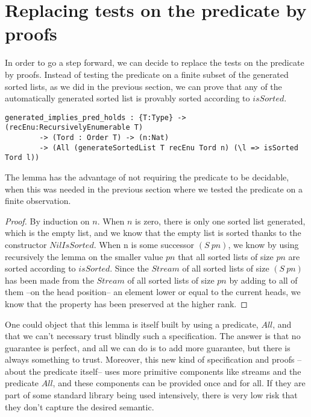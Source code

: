 \section{Replacing tests on the predicate by proofs}

\label{sect:aStepForward}

In order to go a step forward, we can decide to replace the tests on the predicate by proofs. Instead of testing the predicate on a finite subset of the generated sorted lists, as we did in the previous section, we can prove that any of the automatically generated sorted list is provably sorted according to $isSorted$.

\begin{lstlisting}
generated_implies_pred_holds : {T:Type} -> (recEnu:RecursivelyEnumerable T) 
        -> (Tord : Order T) -> (n:Nat) 
        -> (All (generateSortedList T recEnu Tord n) (\l => isSorted Tord l))
\end{lstlisting}

The lemma has the advantage of not requiring the predicate to be decidable, when this was needed in the previous section where we tested the predicate on a finite observation.

\begin{proof}
By induction on $n$.
When $n$ is zero, there is only one sorted list generated, which is the empty list, and we know that the empty list is sorted thanks to the constructor $NilIsSorted$. When n is some successor $(S\ pn)$, we know by using recursively the lemma on the smaller value $pn$ that all sorted lists of size $pn$ are sorted according to $isSorted$. Since the $Stream$ of all sorted lists of size $(S\ pn)$ has been made from the $Stream$ of all sorted lists of size $pn$ by adding to all of them --on the head position-- an element lower or equal to the current heads, we know that the property has been preserved at the higher rank.
\end{proof}

One could object that this lemma is itself built by using a predicate, $All$, and that we can't necessary trust blindly such a specification. The answer is that no guarantee is perfect, and all we can do is to add more guarantee, but there is always something to trust. Moreover, this new kind of specification and proofs --about the predicate itself-- uses more primitive components like streams and the predicate $All$, and these components can be provided once and for all. If they are part of some standard library being used intensively, there is very low risk that they don't capture the desired semantic.

